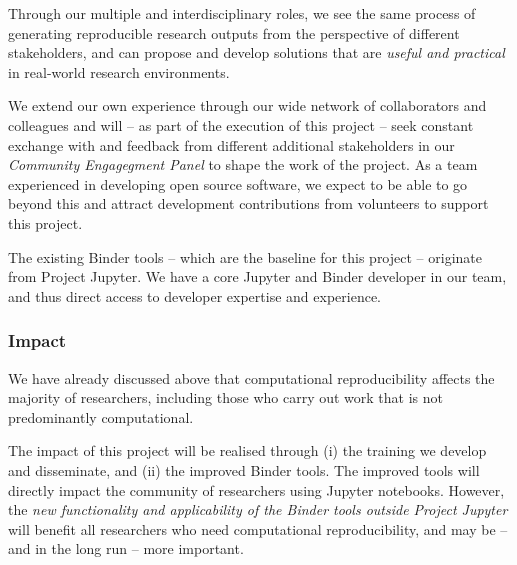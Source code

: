 Through our multiple and interdisciplinary roles, we see the same process of
generating reproducible research outputs from the perspective of different
stakeholders, and can propose and develop solutions that are \emph{useful and
  practical} in real-world research environments.

We extend our own experience through our wide network of collaborators and
colleagues and will -- as part of the execution of this project -- seek
constant exchange with and feedback from different additional stakeholders in
our \emph{Community Engagegment Panel} to shape the work of the
\TheProject project. As a team experienced in developing open source software,
we expect to be able to go beyond this and attract development contributions
from volunteers to support this project.

The existing Binder tools -- which are the baseline for this project --
originate from Project Jupyter. We have a core Jupyter and Binder developer in
our team, and thus direct access to developer expertise and experience.

\subsubsection{Impact}

We have already discussed above that computational reproducibility affects the
majority of researchers, including those who carry out work that is not
predominantly computational.

The impact of this project will be realised through (i) the training we develop
and disseminate, and (ii) the improved Binder tools. The improved tools will
directly impact the community of researchers using Jupyter notebooks. However,
the \emph{new functionality and applicability of the Binder tools outside Project
Jupyter} will benefit all researchers who need computational reproducibility, and
may be -- and in the long run -- more important.

\medskip

